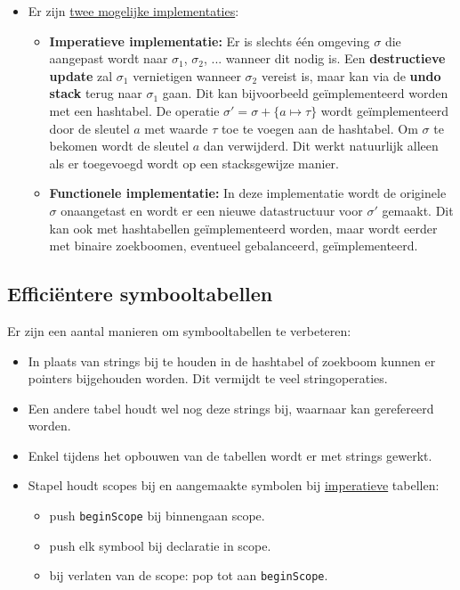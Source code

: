 \begin{itemize}
	\alert De $+$ operatie bij twee omgevingen is hier niet commutatief. De precieze betekenis hangt af van de scoping regels van een taal.
	\item Er zijn \underline{twee mogelijke implementaties}:
	\begin{itemize}
		\item \textbf{Imperatieve implementatie:} Er is slechts één omgeving $\sigma$ die aangepast wordt naar $\sigma_1$, $\sigma_2$, ... wanneer dit nodig is. Een \textbf{destructieve update} zal $\sigma_1$ vernietigen wanneer $\sigma_2$ vereist is, maar kan via de \textbf{undo stack} terug naar $\sigma_1$ gaan. Dit kan bijvoorbeeld geïmplementeerd worden met een hashtabel. De operatie $\sigma' = \sigma + \{a \mapsto \tau \}$ wordt geïmplementeerd door de sleutel $a$ met waarde $\tau$ toe te voegen aan de hashtabel. Om $\sigma$ te bekomen wordt de sleutel $a$ dan verwijderd. Dit werkt natuurlijk alleen als er toegevoegd wordt op een stacksgewijze manier.
		\item \textbf{Functionele implementatie:} In deze implementatie wordt de originele $\sigma$ onaangetast en wordt er een nieuwe datastructuur voor $\sigma'$ gemaakt. Dit kan ook met hashtabellen geïmplementeerd worden, maar wordt eerder met binaire zoekboomen, eventueel gebalanceerd, geïmplementeerd.
	\end{itemize}
\end{itemize}

\subsection{Efficiëntere symbooltabellen}
Er zijn een aantal manieren om symbooltabellen te verbeteren:
\begin{itemize}
	\item In plaats van strings bij te houden in de hashtabel of zoekboom kunnen er pointers bijgehouden worden. Dit vermijdt te veel stringoperaties.
	\item Een andere tabel houdt wel nog deze strings bij, waarnaar kan gerefereerd worden.
	\item Enkel tijdens het opbouwen van de tabellen wordt er met strings gewerkt.
	\item Stapel houdt scopes bij en aangemaakte symbolen bij \underline{imperatieve} tabellen:
	\begin{itemize}
		\item push \texttt{beginScope} bij binnengaan scope.
		\item push elk symbool bij declaratie in scope.
		\item bij verlaten van de scope: pop tot aan \texttt{beginScope}.
	\end{itemize}
\end{itemize}




